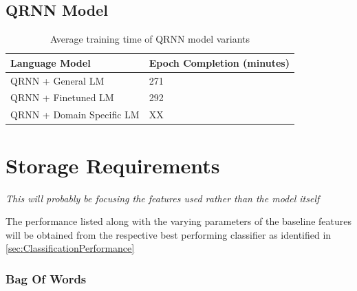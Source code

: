 \documentclass[a4paper,twoside,phd]{BYUPhys}
\begin{document}
\subsection{QRNN Model}
\label{sec:TrainingTimeQRNN}
\begin{table}[]
	\centering

	\begin{tabular}{|p{4cm}|p{5cm}|}
		\hline

		\textbf{Language Model} & \textbf{Epoch Completion \newline (minutes)}                                                                                                                                                                                                                                                                                                                                                    \\
		\hline                                                                                                                                              
		
		QRNN + General LM  & 271  \\
		\hline
		
		QRNN + \newline Finetuned LM  & 292  \\
		\hline
		
		QRNN + \newline Domain Specific LM  & XX  \\
		\hline
		
		
		
	\end{tabular}
	\caption{Average training time of QRNN model variants}
	\label{table:DLTrainingTime}
\end{table}

\section{Storage Requirements}
\label{sec:StorageRequirements}

\textit{This will probably be focusing the features used rather than the model itself}

The performance listed along with the varying parameters of the baseline features will be obtained from the respective best performing classifier as identified in \ref{sec:ClassificationPerformance}

\subsubsection{Bag Of Words}
\label{sec:BoWStorageRequirements}
\end{document}
